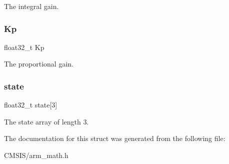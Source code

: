 The integral gain. \mbox{\label{structarm__pid__instance__f32_abe23f3e122ef5f55398fcf77c793c425}} 
\subsubsection{\texorpdfstring{Kp}{Kp}}
{\footnotesize\ttfamily float32\+\_\+t Kp}

The proportional gain. \mbox{\label{structarm__pid__instance__f32_a473556ac6100fc188e77930d56f51062}} 
\subsubsection{\texorpdfstring{state}{state}}
{\footnotesize\ttfamily float32\+\_\+t state\mbox{[}3\mbox{]}}

The state array of length 3. 

The documentation for this struct was generated from the following file\+:\begin{DoxyCompactItemize}
\item 
C\+M\+S\+I\+S/arm\+\_\+math.\+h\end{DoxyCompactItemize}

